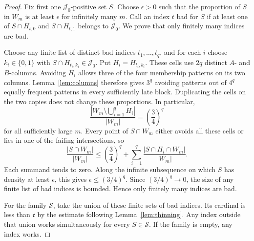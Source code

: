 \begin{proof}
Fix first one $\mathcal J_0$-positive set $S$. Choose $\epsilon>0$
such that the proportion of $S$ in $W_m$ is at least $\epsilon$ for
infinitely many $m$. Call an index $t$ bad for $S$ if at least one
of $S\cap H_{t,0}$ and $S\cap H_{t,1}$ belongs to $\mathcal J_0$.
We prove that only finitely many indices are bad.

Choose any finite list of distinct bad indices $t_1,\ldots,t_q$, and
for each $i$ choose $k_i\in\{0,1\}$ with
$S\cap H_{t_i,k_i}\in\mathcal J_0$. Put $H_i=H_{t_i,k_i}$.
These cells use $2q$ distinct $A$- and $B$-columns. Avoiding $H_i$
allows three of the four membership patterns on its two columns.
Lemma~\ref{lem:columns} therefore gives $3^q$ avoiding patterns out of
$4^q$ equally frequent patterns in every sufficiently late block.
Duplicating the cells on the two copies does not change these proportions.
In particular,
\[
 \frac{|W_m\setminus\bigcup_{i=1}^qH_i|}{|W_m|}
 =\left(\frac34\right)^q
\]
for all sufficiently large $m$. Every point of $S\cap W_m$ either
avoids all these cells or lies in one of the failing intersections, so
\[
 \frac{|S\cap W_m|}{|W_m|}
 \le \left(\frac34\right)^q+
       \sum_{i=1}^q\frac{|S\cap H_i\cap W_m|}{|W_m|}.
\]
Each summand tends to zero. Along the infinite subsequence on which
$S$ has density at least $\epsilon$, this gives
$\epsilon\le(3/4)^q$. Since $(3/4)^q\to0$, the size of any finite
list of bad indices is bounded. Hence only finitely many indices are bad.

For the family $\mathscr S$, take the union of these finite sets of
bad indices. Its cardinal is less than $\mathfrak c$ by the estimate
following Lemma~\ref{lem:thinning}. Any index outside that union
works simultaneously for every $S\in\mathscr S$. If the family is
empty, any index works.
\end{proof}
